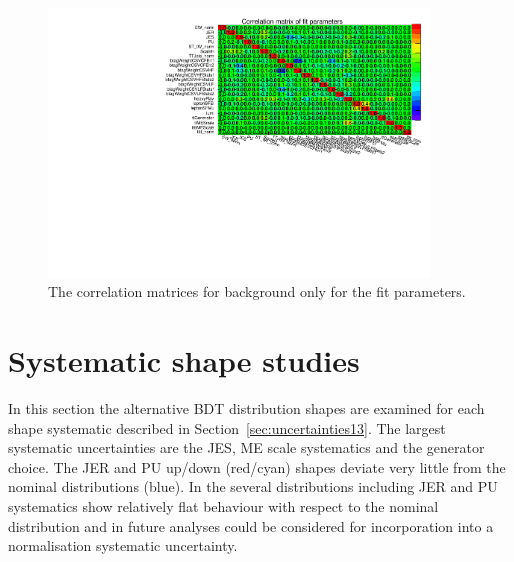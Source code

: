\begin{figure}[ht!]
    \includegraphics[width=0.9\textwidth]{images/Run2/FitCorr.pdf}
    \caption{The correlation matrices for background only for the fit parameters.}
    \label{fig:FitCorr}
\end{figure}
\section{Systematic shape studies}

In this section the alternative BDT distribution shapes are examined for each shape systematic described in Section~\ref{sec:uncertainties13}. The largest systematic uncertainties are the JES, ME scale systematics and the \ttbar generator choice. The JER and PU up/down (red/cyan) shapes deviate very little from the nominal distributions (blue). In \ttbar the several distributions including JER and PU systematics show relatively flat behaviour with respect to the nominal distribution and in future analyses could be considered for incorporation into a normalisation systematic uncertainty.


